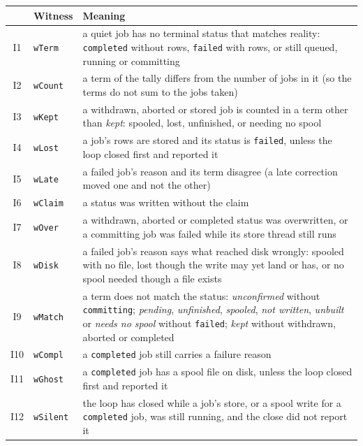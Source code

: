 \documentclass[a4paper,10pt,fleqn]{article}
\newcommand{\field}[1]{\texttt{#1}}
\begin{document}
\begin{center}
\begin{tabular}{@{}cll@{}}
\toprule
 & Witness & Meaning \\
\midrule
I1 & \field{wTerm} & a quiet job has no terminal status that matches reality:
  \field{completed} without rows, \field{failed} with rows, or still queued, running or
  committing \\
I2 & \field{wCount} & a term of the tally differs from the number of jobs in
  it (so the terms do not sum to the jobs taken) \\
I3 & \field{wKept} & a withdrawn, aborted or stored job is counted in a term
  other than \emph{kept}: spooled, lost, unfinished, or needing no spool \\
I4 & \field{wLost} & a job's rows are stored and its status is \field{failed},
  unless the loop closed first and reported it \\
I5 & \field{wLate} & a failed job's reason and its term disagree (a late
  correction moved one and not the other) \\
I6 & \field{wClaim} & a status was written without the claim \\
I7 & \field{wOver} & a withdrawn, aborted or completed status was overwritten,
  or a committing job was failed while its store thread still runs \\
I8 & \field{wDisk} & a failed job's reason says what reached disk wrongly:
  spooled with no file, lost though the write may yet land or has, or no spool
  needed though a file exists \\
I9 & \field{wMatch} & a term does not match the status: \emph{unconfirmed}
  without \field{committing}; \emph{pending}, \emph{unfinished}, \emph{spooled},
  \emph{not written}, \emph{unbuilt} or \emph{needs no spool} without
  \field{failed}; \emph{kept} without withdrawn, aborted or completed \\
I10 & \field{wCompl} & a \field{completed} job still carries a failure reason \\
I11 & \field{wGhost} & a \field{completed} job has a spool file on disk, unless the
  loop closed first and reported it \\
I12 & \field{wSilent} & the loop has closed while a job's store, or a spool write
  for a \field{completed} job, was still running, and the close did not report it \\
\bottomrule
\end{tabular}
\end{center}
\end{document}
